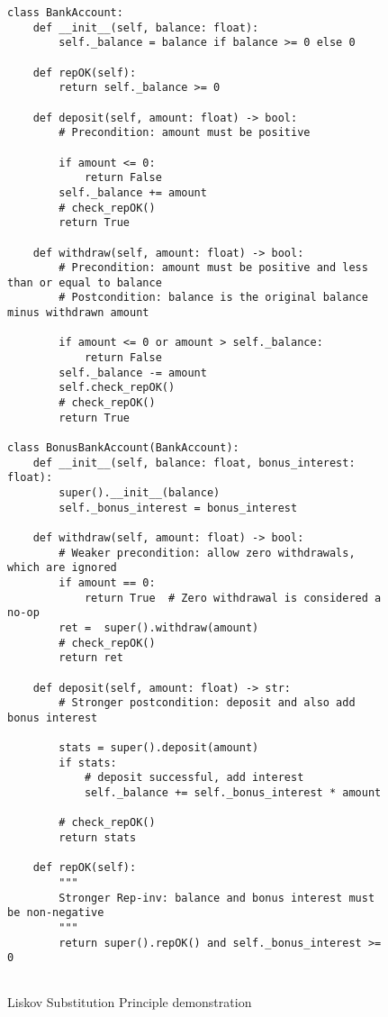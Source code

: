 \documentclass[oneside,11pt,dvipsnames]{book}
\begin{document}
\begin{figure}
    \begin{lstlisting}
class BankAccount:
    def __init__(self, balance: float):
        self._balance = balance if balance >= 0 else 0  
        
    def repOK(self):
        return self._balance >= 0

    def deposit(self, amount: float) -> bool:
        # Precondition: amount must be positive
        
        if amount <= 0:
            return False
        self._balance += amount
        # check_repOK()
        return True

    def withdraw(self, amount: float) -> bool:
        # Precondition: amount must be positive and less than or equal to balance
        # Postcondition: balance is the original balance minus withdrawn amount

        if amount <= 0 or amount > self._balance:
            return False
        self._balance -= amount
        self.check_repOK()
        # check_repOK()
        return True

class BonusBankAccount(BankAccount):
    def __init__(self, balance: float, bonus_interest: float):
        super().__init__(balance)
        self._bonus_interest = bonus_interest

    def withdraw(self, amount: float) -> bool:
        # Weaker precondition: allow zero withdrawals, which are ignored
        if amount == 0:
            return True  # Zero withdrawal is considered a no-op
        ret =  super().withdraw(amount)
        # check_repOK()
        return ret
    
    def deposit(self, amount: float) -> str:
        # Stronger postcondition: deposit and also add bonus interest

        stats = super().deposit(amount)
        if stats:
            # deposit successful, add interest
            self._balance += self._bonus_interest * amount
        
        # check_repOK()
        return stats
    
    def repOK(self):
        """
        Stronger Rep-inv: balance and bonus interest must be non-negative
        """
        return super().repOK() and self._bonus_interest >= 0
        
    \end{lstlisting}
\caption{Liskov Substitution Principle demonstration}\label{ex:lsp}
\end{figure}
\end{document}
